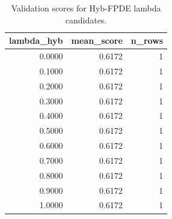 \begin{table}[t]
\caption{Validation scores for Hyb-FPDE lambda candidates.}
\label{tab:lambda_distribution_computed}
\centering
\begin{tabular}{rrr}
\toprule
lambda\_hyb & mean\_score & n\_rows \\
\midrule
0.0000 & 0.6172 & 1 \\
0.1000 & 0.6172 & 1 \\
0.2000 & 0.6172 & 1 \\
0.3000 & 0.6172 & 1 \\
0.4000 & 0.6172 & 1 \\
0.5000 & 0.6172 & 1 \\
0.6000 & 0.6172 & 1 \\
0.7000 & 0.6172 & 1 \\
0.8000 & 0.6172 & 1 \\
0.9000 & 0.6172 & 1 \\
1.0000 & 0.6172 & 1 \\
\bottomrule
\end{tabular}

\end{table}
